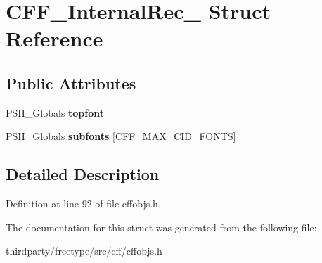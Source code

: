 \hypertarget{struct_c_f_f___internal_rec__}{}\section{C\+F\+F\+\_\+\+Internal\+Rec\+\_\+ Struct Reference}
\label{struct_c_f_f___internal_rec__}
\subsection*{Public Attributes}
\begin{DoxyCompactItemize}
\item 
\mbox{\label{struct_c_f_f___internal_rec___a90029dad86da775688055435e92c976a}} 
P\+S\+H\+\_\+\+Globals {\bfseries topfont}
\item 
\mbox{\label{struct_c_f_f___internal_rec___a8d56228d8d069c1bc91448877d8451ed}} 
P\+S\+H\+\_\+\+Globals {\bfseries subfonts} \mbox{[}C\+F\+F\+\_\+\+M\+A\+X\+\_\+\+C\+I\+D\+\_\+\+F\+O\+N\+TS\mbox{]}
\end{DoxyCompactItemize}


\subsection{Detailed Description}


Definition at line 92 of file cffobjs.\+h.



The documentation for this struct was generated from the following file\+:\begin{DoxyCompactItemize}
\item 
thirdparty/freetype/src/cff/cffobjs.\+h\end{DoxyCompactItemize}
